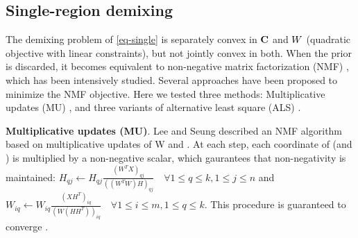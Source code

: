 \subsection{Single-region demixing}
The demixing problem of \eqref{eq-single} is separately convex in $\mathbf{C}$ and $W$ (quadratic objective with linear constraints), but not jointly convex in both. When the prior is discarded, it becomes equivalent to non-negative matrix factorization (NMF) \cite{leenmfs}, which has been intensively studied. Several approaches have been proposed to minimize the NMF objective.
%
Here we tested three methods: Multiplicative updates (MU) \cite{leenmfs}, and three variants of alternative least square (ALS) \cite{lin2007projected,kim2008activeset,kim2011fast}. 

{\bf {Multiplicative updates (MU)}}. Lee and Seung \citet{leenmfs} described an NMF algorithm based on multiplicative updates of W and \Htext. At each step, each coordinate of \Htext (and \W) is multiplied by a non-negative scalar, which gaurantees that non-negativity is maintained: $H_{qj} \leftarrow H_{qj} \frac{(W^TX)_{qj}}{((W^TW)H)_{qj}} \quad
\forall 1\leq q \leq k, 1\leq j \leq n$ and $W_{iq} \leftarrow W_{iq} \frac{(XH^T)_{iq}}{(W(HH^T))_{iq}} \quad \forall 1\leq i \leq m, 1\leq q \leq k$.
This procedure is guaranteed to converge \cite{leenmfs,lin2007convergence}. 

